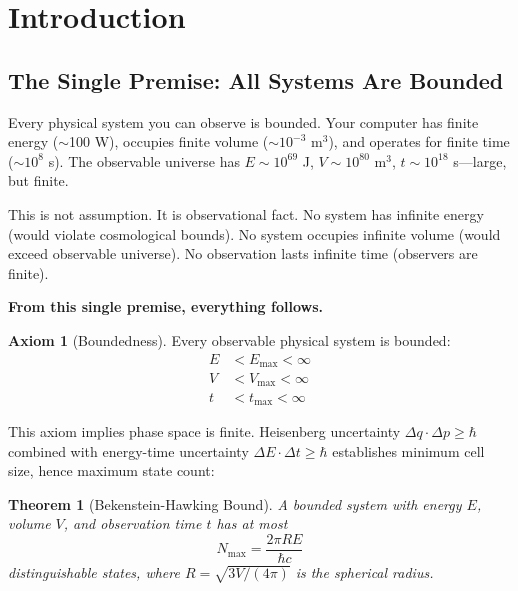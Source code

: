 \documentclass[twocolumn,10pt]{revtex4-2}
\newtheorem{theorem}{Theorem}[section]
\theoremstyle{definition}
\newtheorem{axiom}{Axiom}
\theoremstyle{remark}
\newcommand{\Nmax}{N_{\max}}
\begin{document}
\section{Introduction}
\label{sec:introduction}

\subsection{The Single Premise: All Systems Are Bounded}

Every physical system you can observe is bounded. Your computer has finite energy ($\sim$100 W), occupies finite volume ($\sim 10^{-3}$ m$^3$), and operates for finite time ($\sim 10^8$ s). The observable universe has $E \sim 10^{69}$ J, $V \sim 10^{80}$ m$^3$, $t \sim 10^{18}$ s—large, but finite.

This is not assumption. It is observational fact. No system has infinite energy (would violate cosmological bounds). No system occupies infinite volume (would exceed observable universe). No observation lasts infinite time (observers are finite).

\vspace{0.2cm}
\noindent\textbf{From this single premise, everything follows.}

\begin{axiom}[Boundedness]
\label{ax:bounded}
Every observable physical system is bounded:
\begin{align}
E &< E_{\max} < \infty \label{eq:energy_bound}\\
V &< V_{\max} < \infty \label{eq:volume_bound}\\
t &< t_{\max} < \infty \label{eq:time_bound}
\end{align}
\end{axiom}

\noindent This axiom implies phase space is finite. Heisenberg uncertainty $\Delta q \cdot \Delta p \geq \hbar$ combined with energy-time uncertainty $\Delta E \cdot \Delta t \geq \hbar$ establishes minimum cell size, hence maximum state count:

\begin{theorem}[Bekenstein-Hawking Bound]
\label{thm:bekenstein}
A bounded system with energy $E$, volume $V$, and observation time $t$ has at most
\begin{equation}
\Nmax = \frac{2\pi RE}{\hbar c}
\label{eq:bekenstein}
\end{equation}
distinguishable states, where $R = \sqrt{3V/(4\pi)}$ is the spherical radius.
\end{theorem}
\end{document}
